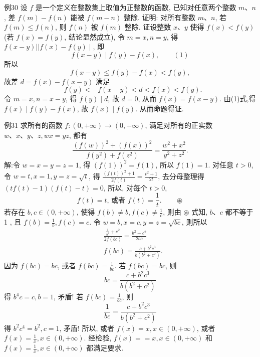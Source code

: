 例30 设 $f$ 是一个定义在整数集上取值为正整数的函数, 已知对任意两个整数 $m 、 n$, 差 $f(m)-f(n)$ 能被 $f(m-n)$ 整除.
证明: 对所有整数 $m 、 n$, 若$f(m) \leqslant f(n)$, 则 $f(n)$ 被 $f(m)$ 整除.
证设整数 $x 、 y$ 使得 $f(x)<f(y)$ (若 $f(x)=f(y)$, 结论显然成立), 令 $m=x, n=y$, 得 $f(x-y)|| f(x)-f(y) \mid$,
即
$$
f(x-y) \mid f(y)-f(x), \quad\quad (1)
$$
所以
$$
f(x-y) \leqslant f(y)-f(x)<f(y),
$$
故差 $d=f(x)-f(x-y)$ 满足
$$
-f(y)<-f(x-y)<d<f(x)<f(y) .
$$
令 $m=x, n=x-y$, 得 $f(y) \mid d$, 故 $d=0$, 从而 $f(x)=f(x-y)$.
由(1)式,得 $f(x) \mid f(y)-f(x)$, 故 $f(x) \mid f(y)$. 从而命题得证.



例31 求所有的函数 $f:(0,+\infty) \rightarrow(0,+\infty)$, 满足对所有的正实数 $w 、 x 、 y 、 z, w x=y z$, 都有
$$
\frac{(f(w))^2+(f(x))^2}{f\left(y^2\right)+f\left(z^2\right)}=\frac{w^2+x^2}{y^2+z^2} .
$$
解:令 $w=x=y=z=1$, 得 $(f(1))^2=f(1)$, 所以 $f(1)=1$.
对任意 $t>0$, 令 $w=t, x=1, y=z=\sqrt{t}$, 得 $\frac{(f(t))^2+1}{2 f(t)}=\frac{t^2+1}{2 t}$, 去分母整理得 $(t f(t)-1)(f(t)-t)=0$, 所以, 对每个 $t>0$,
$$
f(t)=t \text {, 或者 } f(t)=\frac{1}{t} . \quad\quad \circledast
$$
若存在 $b, c \in(0,+\infty)$, 使得 $f(b) \neq b, f(c) \neq \frac{1}{c}$, 则由 $\circledast$ 式知, $b 、 c$ 都不等于 1 , 且 $f(b)=\frac{1}{b}, f(c)=c$. 令 $w=b, x=c, y=z=\sqrt{b c}$, 则所以
$$
\begin{aligned}
& \frac{\frac{1}{b^2}+c^2}{2 f(b c)}=\frac{b^2+c^2}{2 b c} \\
& f(b c)=\frac{c+b^2 c^3}{b\left(b^2+c^2\right)} .
\end{aligned}
$$
因为 $f(b c)=b c$, 或者 $f(b c)=\frac{1}{b c}$. 若 $f(b c)=b c$, 则
$$
b c=\frac{c+b^2 c^3}{b\left(b^2+c^2\right)}
$$
得 $b^4 c=c, b=1$, 矛盾! 若 $f(b c)=\frac{1}{b c}$, 则
$$
\frac{1}{b c}=\frac{c+b^2 c^3}{b\left(b^2+c^2\right)}
$$
得 $b^2 c^4=b^2, c=1$, 矛盾!
所以, 或者 $f(x)=x, x \in(0,+\infty)$, 或者 $f(x)=\frac{1}{x}, x \in(0,+\infty)$.
经检验, $f(x)==x, x \in(0,+\infty)$ 和 $f(x)=\frac{1}{x}, x \in(0,+\infty)$ 都满足要求.



